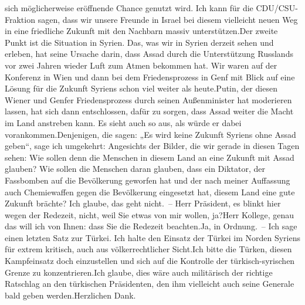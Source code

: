 \documentclass{article}
\begin{document}
sich möglicherweise eröffnende Chance genutzt wird. Ich kann für die CDU/CSU-Fraktion sagen, dass wir unsere Freunde in Israel bei diesem vielleicht neuen Weg in eine friedliche Zukunft mit den Nachbarn massiv unterstützen.Der zweite Punkt ist die Situation in Syrien. Das, was wir in Syrien derzeit sehen und erleben, hat seine Ursache darin, dass Assad durch die Unterstützung Russlands vor zwei Jahren wieder Luft zum Atmen bekommen hat. Wir waren auf der Konferenz in Wien und dann bei dem Friedensprozess in Genf mit Blick auf eine Lösung für die Zukunft Syriens schon viel weiter als heute.Putin, der diesen Wiener und Genfer Friedensprozess durch seinen Außenminister hat moderieren lassen, hat sich dann entschlossen, dafür zu sorgen, dass Assad weiter die Macht im Land anstreben kann. Es sieht auch so aus, als würde er dabei vorankommen.Denjenigen, die sagen: „Es wird keine Zukunft Syriens ohne Assad geben“, sage ich umgekehrt: Angesichts der Bilder, die wir gerade in diesen Tagen sehen: Wie sollen denn die Menschen in diesem Land an eine Zukunft mit Assad glauben? Wie sollen die Menschen daran glauben, dass ein Diktator, der Fassbomben auf die Bevölkerung geworfen hat und der nach meiner Auffassung auch Chemiewaffen gegen die Bevölkerung eingesetzt hat, diesem Land eine gute Zukunft brächte? Ich glaube, das geht nicht. – Herr Präsident, es blinkt hier wegen der Redezeit, nicht, weil Sie etwas von mir wollen, ja?Herr Kollege, genau das will ich von Ihnen: dass Sie die Redezeit beachten.Ja, in Ordnung. – Ich sage einen letzten Satz zur Türkei. Ich halte den Einsatz der Türkei im Norden Syriens für extrem kritisch, auch aus völkerrechtlicher Sicht.Ich bitte die Türken, diesen Kampfeinsatz doch einzustellen und sich auf die Kontrolle der türkisch-syrischen Grenze zu konzentrieren.Ich glaube, dies wäre auch militärisch der richtige Ratschlag an den türkischen Präsidenten, den ihm vielleicht auch seine Generale bald geben werden.Herzlichen Dank.
\end{document}
